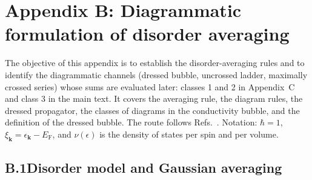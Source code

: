 \providecommand{\SE}{\Xi}%

\newpage
\section*{Appendix B: Diagrammatic formulation of disorder averaging}
\label{app:disorder}

\noindent
The objective of this appendix is to establish the disorder-averaging
rules and to identify the diagrammatic channels (dressed bubble,
uncrossed ladder, maximally crossed series) whose sums are evaluated
later: classes 1 and 2 in Appendix~C and class 3 in the main text.
It covers the averaging rule, the diagram rules, the dressed
propagator, the classes of diagrams in the conductivity bubble, and
the definition of the dressed bubble. The route follows
Refs.~\cite{BruusFlensberg,Coleman2015}. Notation: $\hbar=1$,
$\xi_{\mathbf k}=\epsilon_{\mathbf k}-E_{\mathrm F}$, and
$\nu(\epsilon)$ is the density of states per spin and per volume.

\subsection*{B.1\quad Disorder model and Gaussian averaging}

